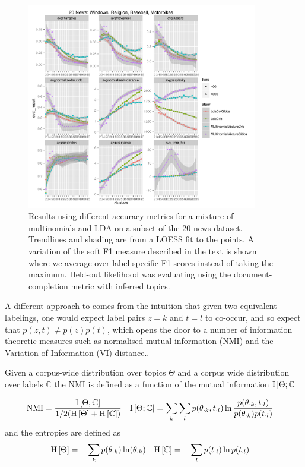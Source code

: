 \begin{figure}
  \centering
    \includegraphics[width=0.9\textwidth]{../Chap3a/plots/20news-2013-03-25.pdf}
  \caption{Results using different accuracy metrics for a mixture of multinomials and LDA on a subset of the 20-news dataset. Trendlines and shading are from a LOESS fit to the points. A variation of the soft F1 measure described in the text is shown where we average over label-specific F1 scores instead of taking the maximum. Held-out likelihood was evaluating using the document-completion metric with inferred topics.}
  \label{fig:eval-metrics-shootout}
\end{figure}


A different approach to comes from the intuition that given two equivalent labelings, one would expect label pairs $z=k$ and $t=l$ to co-occur, and so expect that $p(z,t) \neq p(z)p(t)$, which opens the door to a number of information theoretic measures such as normalised mutual information (NMI) and the Variation of Information (VI) distance..

\newcommand{\TopDist}{\Theta}
\newcommand{\LabDist}{\mathbb{C}}
\newcommand{\NMI}{\text{NMI}}

Given a corpus-wide distribution over topics $\TopDist$ and a corpus wide distribution over labels $\LabDist$ the NMI is defined as a function of the mutual information $\mut{\TopDist}{\LabDist}$

\begin{align}
\NMI & = \frac{\mut{\TopDist}{\LabDist}}{1/2(\ent{\TopDist} + \ent{\LabDist})} &
\mut{\TopDist}{\LabDist} & = \sum_k \sum_l p(\theta_{\cdot k}, t_{\cdot l}) \ln \frac{p(\theta_{\cdot k}, t_{\cdot l})}{p(\theta_{\cdot k})p(t_{\cdot l})}
\end{align}
and the entropies are defined as
\begin{align}
\ent{\TopDist} & = - \sum_k p(\theta_{\cdot k}) \ln (\theta_{\cdot k}) &
\ent{\LabDist} & = - \sum_l p(t_{\cdot l}) \ln p(t_{\cdot l})
\end{align}

